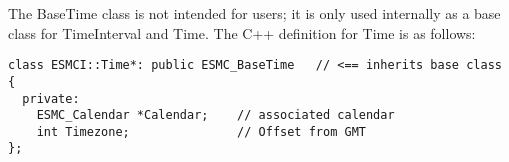 
The BaseTime class is not intended for users; it is only used internally
as a base class for TimeInterval and Time.  The C++ definition for
Time is as follows:

\begin{verbatim}
class ESMCI::Time*: public ESMC_BaseTime   // <== inherits base class
{
  private:
    ESMC_Calendar *Calendar;    // associated calendar
    int Timezone;               // Offset from GMT
};
\end{verbatim}
